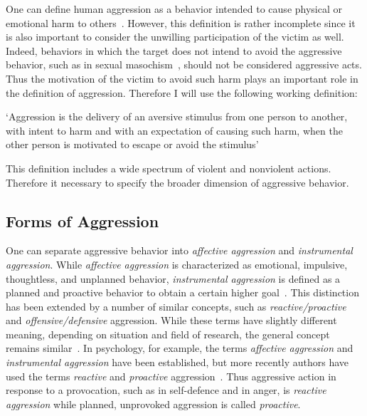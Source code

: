 One can define human aggression as a behavior intended to cause physical or emotional harm to others~\cite{Anderson2002}.
However, this definition is rather incomplete since it is also important to consider the unwilling participation of the victim as well.
Indeed, behaviors in which the target does not intend to avoid the aggressive behavior, such as in sexual masochism~\cite{Berkowitz1993,Baumeister1989,Baron2007,Geen2001}, should not be considered  aggressive acts.
Thus the motivation of the victim to avoid such harm plays an important role in the definition of aggression.  
Therefore I will use the following working definition:
\begin{mydef}[Aggression]\label{def:aggression}
	`Aggression is the delivery of an aversive stimulus from one person to another, with intent to harm and with an expectation of causing such harm, when the other person is motivated to escape or avoid the stimulus'~\cite{Geen2001}
\end{mydef}

This definition includes a wide spectrum of violent and nonviolent actions.
Therefore it necessary to specify the broader dimension of aggressive behavior.

\subsection{Forms of Aggression}
\label{sub:forms_of_aggression}

One can separate aggressive behavior into \textit{affective aggression} and \textit{instrumental aggression}.
While \textit{affective aggression} is characterized as emotional, impulsive, thoughtless, and unplanned behavior, \textit{instrumental aggression} is defined as a planned and proactive behavior to obtain a certain higher goal~\cite{Berkowitz1993,Geen2001}.
This distinction has been extended by a number of similar concepts, such as \textit{reactive/proactive} and \textit{offensive/defensive} aggression.
While these terms have slightly different meaning, depending on situation and field of research, the general concept remains similar~\cite{Geen2001, Blanchard2005b}.
In psychology, for example, the terms \textit{affective aggression} and \textit{instrumental aggression} have been established, but more recently authors have used the terms \textit{reactive} and \textit{proactive} aggression~\cite{Geen2001}.
Thus aggressive action in response to a provocation, such as in self-defence and in anger, is \textit{reactive aggression} while planned, unprovoked aggression is called \textit{proactive}.

